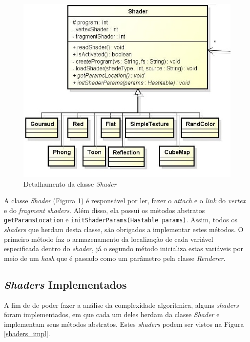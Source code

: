 	\begin{figure}[h]
	\centering
		\includegraphics[keepaspectratio=true,scale=0.6]{figuras/shaders_diag.jpg}
	\caption{Detalhamento da classe \textit{Shader}}
	\label{shaders_diag}
	\end{figure}

	A classe \textit{Shader} (Figura \ref{shaders_diag}) é responsável por ler, fazer o \textit{attach} e o \textit{link} do \textit{ vertex} e do \textit{fragment shaders}. Além disso, ela possui os métodos abstratos \texttt{getParamsLocation} e \texttt{initShaderParams(Hastable params)}. Assim, todos os \textit{shaders} que herdam desta classe, são obrigados a implementar estes métodos. O primeiro método faz o armazenamento da localização de cada variável especificada dentro do \textit{shader}, já o segundo método inicializa estas variáveis por meio de um \textit{hash} que é passado como um parâmetro pela classe \textit{Renderer}.     

	\subsection{ \textit{Shaders} Implementados}    

	A fim de de poder fazer a análise da complexidade algorítmica, alguns \textit{shaders} foram implementados, em que cada um deles herdam da classe \textit{Shader} e implementam seus métodos abstratos. Estes \textit{shaders} podem ser vistos na Figura \ref{shaders_impl}.  

